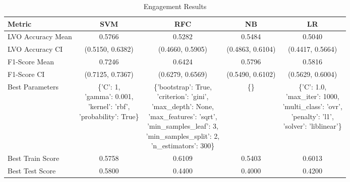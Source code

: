 \begin{table}[h!]
\centering
\begin{tabular}{|l|c|c|c|c|}
\hline
\textbf{Metric}           & \textbf{SVM}    & \textbf{RFC}    & \textbf{NB}     & \textbf{LR}     \\ \hline
LVO Accuracy Mean         & 0.5766          & 0.5282          & 0.5484          & 0.5040          \\ \hline
LVO Accuracy CI           & (0.5150, 0.6382)& (0.4660, 0.5905)& (0.4863, 0.6104)& (0.4417, 0.5664)\\ \hline
F1-Score Mean             & 0.7246          & 0.6424          & 0.5796          & 0.5816          \\ \hline
F1-Score CI               & (0.7125, 0.7367)& (0.6279, 0.6569)& (0.5490, 0.6102)& (0.5629, 0.6004)\\ \hline
Best Parameters           & \makecell[l]{\{'C': 1,\\ 'gamma': 0.001,\\ 'kernel': 'rbf',\\ 'probability': True\}} & \makecell[l]{\{'bootstrap': True,\\ 'criterion': 'gini',\\ 'max\_depth': None,\\ 'max\_features': 'sqrt',\\ 'min\_samples\_leaf': 3,\\ 'min\_samples\_split': 2,\\ 'n\_estimators': 300\}} & \{\} & \makecell[l]{\{'C': 1.0,\\ 'max\_iter': 1000,\\ 'multi\_class': 'ovr',\\ 'penalty': 'l1',\\ 'solver': 'liblinear'\}} \\ \hline
Best Train Score          & 0.5758          & 0.6109          & 0.5403          & 0.6013          \\ \hline
Best Test Score           & 0.5800          & 0.4400          & 0.4000          & 0.4200          \\ \hline
\end{tabular}
\caption{Engagement Results}
\label{table:engagement}
\end{table}
